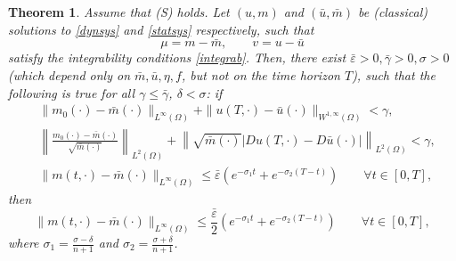 \documentclass[10pt,a4paper,nouppercase,nowrite]{article}
\numberwithin{equation}{section}
\newcommand{\Sp}{{\textsc (S)} }
\newcommand{\eps}{\varepsilon}
\newtheorem{thm}[defn]{Theorem}
\theoremstyle{definition}
\begin{document}
	\begin{thm} \label{apriori}
		Assume that \Sp holds. Let $(u,m)$ and $(\bar u,\bar m)$ be (classical) solutions to \eqref{dynsys} and \eqref{statsys} respectively, such that
		\[
		\mu=m - \bar{m}, \qquad v=u-\bar{u}
		\]
		satisfy the integrability conditions \eqref{integrab}. Then, there exist $\bar{\eps} > 0, \bar{\gamma} > 0, \sigma > 0$ (which depend only on $\bar{m}, \bar u, \eta, f$, but not on the time horizon $T$), such that the following is true for all $\gamma \le \bar{\gamma}$, $\delta < \sigma$: if
		\begin{equation*}
			\begin{aligned}
			& \| m_0(\cdot)-\bar m(\cdot)\| _{L^{\infty}(\Omega)} + \| u(T,\cdot) - \bar u(\cdot)\|_{W^{1,\infty}(\Omega)} < \gamma,
			\\
			& \left \| \frac{m_0(\cdot)-\bar m(\cdot)}{\sqrt{\bar{m}(\cdot)}} \right \|_{L^{2}(\Omega)} + \left\| \sqrt{\bar{m}(\cdot)} \left| Du(T,\cdot) - D\bar u(\cdot) \right| \right\|_{L^2(\Omega)} < \gamma,
			\\
			& \|m(t,\cdot)-\bar m(\cdot)\|_{L^{\infty}(\Omega)} \le \bar{\eps}\left( e^{-\sigma_1 t} + e^{-\sigma_2(T-t)} \right) \qquad \forall t \in [0,T],
		\end{aligned}
		\end{equation*}
		then
		\begin{equation*}
			\|m(t,\cdot)-\bar m(\cdot)\|_{L^{\infty}(\Omega)} \le \frac{\bar{\eps}}{2} \left( e^{-\sigma_1 t} + e^{-\sigma_2(T-t)} \right) \qquad \forall t \in [0,T],
		\end{equation*}
		where $\sigma_1=\frac{\sigma-\delta}{n+1}$ and $\sigma_2=\frac{\sigma+\delta}{n+1}$.
	\end{thm}
	
		
\end{document}
